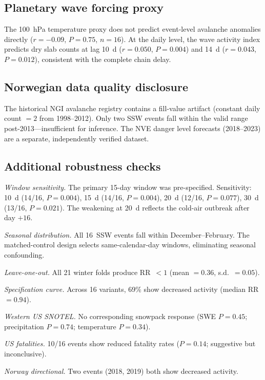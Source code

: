 \documentclass[11pt,letterpaper]{article}
\begin{document}
\subsection{Planetary wave forcing proxy}

The 100~hPa temperature proxy does not predict event-level avalanche anomalies directly ($r = -0.09$, $P = 0.75$, $n = 16$). At the daily level, the wave activity index predicts dry slab counts at lag 10~d ($r = 0.050$, $P = 0.004$) and 14~d ($r = 0.043$, $P = 0.012$), consistent with the complete chain delay.

\subsection{Norwegian data quality disclosure}

The historical NGI avalanche registry contains a fill-value artifact (constant daily count $= 2$ from 1998--2012). Only two SSW events fall within the valid range post-2013---insufficient for inference. The NVE danger level forecasts (2018--2023) are a separate, independently verified dataset.

\subsection{Additional robustness checks}

\textit{Window sensitivity.} The primary 15-day window was pre-specified. Sensitivity: 10~d (14/16, $P = 0.004$), 15~d (14/16, $P = 0.004$), 20~d (12/16, $P = 0.077$), 30~d (13/16, $P = 0.021$). The weakening at 20~d reflects the cold-air outbreak after day $+16$.

\textit{Seasonal distribution.} All 16~SSW events fall within December--February. The matched-control design selects same-calendar-day windows, eliminating seasonal confounding.

\textit{Leave-one-out.} All 21 winter folds produce RR~$< 1$ (mean $= 0.36$, s.d.~$= 0.05$).

\textit{Specification curve.} Across 16 variants, 69\% show decreased activity (median RR~$= 0.94$).

\textit{Western US SNOTEL.} No corresponding snowpack response (SWE $P = 0.45$; precipitation $P = 0.74$; temperature $P = 0.34$).

\textit{US fatalities.} 10/16 events show reduced fatality rates ($P = 0.14$; suggestive but inconclusive).

\textit{Norway directional.} Two events (2018, 2019) both show decreased activity.
\end{document}
